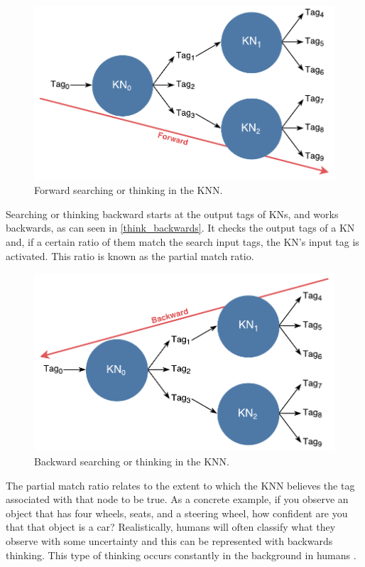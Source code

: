 \documentclass[titlepage,11pt]{article}
\begin{document}
\begin{figure}[!htb]
	\includegraphics[width=\columnwidth]{figures/forward_search.pdf}
	\caption{Forward searching or thinking in the KNN.}
	\label{think_forwards}
\end{figure}

Searching or thinking backward starts at the output tags of KNs, and works backwards, as can seen in \autoref{think_backwards}. It checks the output tags of a KN and, if a certain ratio of them match the search input tags, the KN's input tag is activated. This ratio is known as the partial match ratio.

\begin{figure}[!htb]
	\includegraphics[width=\columnwidth]{figures/backward_search.pdf}
	\caption{Backward searching or thinking in the KNN.}
	\label{think_backwards}
\end{figure}

The partial match ratio relates to the extent to which the KNN believes the tag associated with that node to be true. As a concrete example, if you observe an object that has four wheels, seats, and a steering wheel, how confident are you that that object is a car? Realistically, humans will often classify what they observe with some uncertainty \cite{uncertainty} and this can be represented with backwards thinking. This type of thinking occurs constantly in the background in humans \cite{vybihal-knowledge}.
\end{document}
